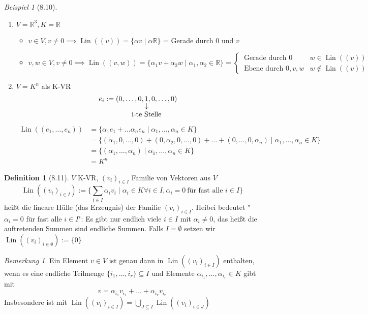 \documentclass[a4paper]{scrartcl}
\DeclareMathOperator{\Forall}{\forall}
\DeclareMathOperator{\Lin}{Lin}
\theoremstyle{definition}
\newtheorem{defn}{Definition}
\theoremstyle{plain}
\theoremstyle{plain}
\theoremstyle{remark}
\newtheorem{remark}{Bemerkung}
\theoremstyle{remark}
\theoremstyle{remark}
\theoremstyle{remark}
\theoremstyle{remark}
\newtheorem{ex}{Beispiel}
\begin{document}
\begin{ex}[8.10]
\mbox{}
\begin{enumerate}
\item $V = \mathbb{R}^3, K = \mathbb{R}$
\begin{itemize}
\item $v \in V, v \neq 0 \implies \Lin((v)) = \{\alpha v \mid \alpha \mathbb{R}\}$ = Gerade durch $0$ und $v$
\item \[v,w \in V, v \neq 0 \implies \Lin((v,w)) = \{\alpha_1 v + \alpha_2 w \mid \alpha_1, \alpha_2 \in \mathbb{R}\} = \begin{cases} ~\text{Gerade durch $0$} & w \in \Lin((v)) \\ ~\text{Ebene durch $0,v,w$} & w\not\in \Lin((v)) \end{cases}\]
\end{itemize}
\item $V = K^n$ als K-VR \\
     \[e_i := (0, \ldots, 0, \underarrow[1]{i-te Stelle}, 0, \ldots, 0)\]
\begin{align*}
\Lin((e_1, \ldots, e_n)) &= \{\alpha_1 e_1 + \ldots \alpha_n e_n \mid \alpha_1, \ldots, \alpha_n \in K \} \\
&= \{(\alpha_1, 0, \ldots, 0) + (0, \alpha_2, 0, \ldots, 0) + \ldots + (0, \ldots, 0, \alpha_n) \mid \alpha_1, \ldots, \alpha_n \in K\} \\
&= \{(\alpha_1, \ldots, \alpha_n) \mid \alpha_1, \ldots, \alpha_n \in K\} \\
&= K^n
\end{align*}
\end{enumerate}
\end{ex}
\begin{defn}[8.11]
$V$ K-VR, $(v_i)_{i\in I}$ Familie von Vektoren aus $V$
\[\Lin((v_i)_{i \in I}) := \{\sum_{i\in I} \alpha_i v_i \mid \alpha_i \in K \Forall i\in I, \alpha_i = 0 ~\text{für fast alle $i\in I$}\}\]
heißt die lineare Hülle (das Erzeugnis) der Familie $(v_i)_{i \in I}$. Heibei bedeutet "$\alpha_i = 0$ für fast alle $i\in I$": Es gibt nur endlich viele $i\in I$ mit $\alpha_i \neq 0$,
das heißt die auftretenden Summen sind endliche Summen. Falls $I = \emptyset$ setzen wir $\Lin((v_i)_{i\in\emptyset}) := \{0\}$
\end{defn}
\begin{remark}
Ein Element $v \in V$ ist genau dann in $\Lin((v_i)_{i\in I})$ enthalten, wenn es eine endliche Teilmenge $\{i_1, \ldots, i_r\} \subseteq I$ und Elemente $\alpha_{i_1}, \ldots, \alpha_{i_r} \in K$ gibt mit
\[v = \alpha_{i_1} v_{i_1} + \ldots + \alpha_{i_r} v_{i_r}\]
Insbesondere ist mit $\Lin((v_i)_{i\in I}) = \bigcup_{J\subseteq I} \Lin((v_i)_{i\in J})$
\end{remark}
\end{document}
